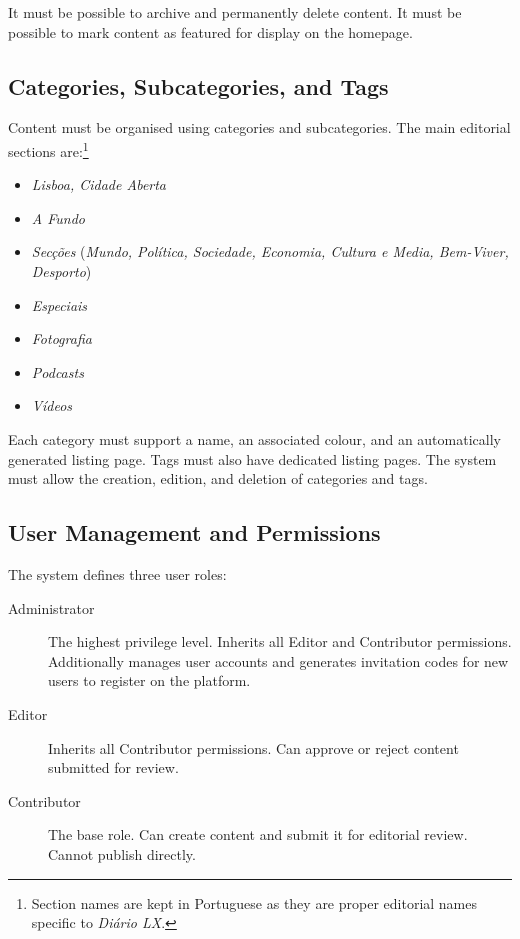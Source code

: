 It must be possible to archive and permanently delete content. It must be possible to mark content as featured for display on the homepage.

\subsection{Categories, Subcategories, and Tags} \label{sec:req_categories}

Content must be organised using categories and subcategories. The main editorial sections are:\footnote{Section names are kept in
      Portuguese as they are proper editorial names specific to \textit{Diário LX}.}
\begin{itemize}
      \item \textit{Lisboa, Cidade Aberta}
      \item \textit{A Fundo}
      \item \textit{Secções} (\textit{Mundo, Política, Sociedade, Economia, Cultura e Media, Bem-Viver, Desporto})
      \item \textit{Especiais}
      \item \textit{Fotografia}
      \item \textit{Podcasts}
      \item \textit{Vídeos}
\end{itemize}

Each category must support a name, an associated colour, and an automatically generated listing page. Tags must also have dedicated listing pages. The system must allow the creation, edition, and deletion of categories and tags.

\subsection{User Management and Permissions} \label{sec:req_users}

The system defines three user roles:

\begin{description}
      \item[Administrator] The highest privilege level. Inherits all Editor and Contributor
            permissions. Additionally manages user accounts and generates invitation codes for
            new users to register on the platform.
      \item[Editor] Inherits all Contributor permissions. Can approve or reject content
            submitted for review.
      \item[Contributor] The base role. Can create content and submit it for editorial
            review. Cannot publish directly.
\end{description}

